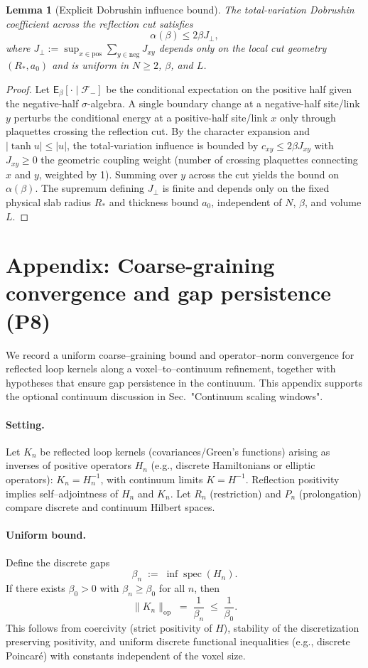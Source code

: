 \documentclass[11pt]{amsart}
\theoremstyle{plain}
\newtheorem{lemma}[theorem]{Lemma}
\theoremstyle{definition}
\theoremstyle{remark}
\begin{document}
\begin{lemma}[Explicit Dobrushin influence bound]\label{lem:dob-influence}
The total-variation Dobrushin coefficient across the reflection cut satisfies
\[
\alpha(\beta) \le 2\beta J_{\perp},
\]
where $J_{\perp} := \sup_{x \in \text{pos}} \sum_{y \in \text{neg}} J_{xy}$ depends only on the local cut geometry $(R_*, a_0)$ and is uniform in $N \ge 2$, $\beta$, and $L$.
\end{lemma}
\begin{proof}
Let $\mathsf{E}_\beta[\cdot \mid \mathcal{F}_{-}]$ be the conditional expectation on the positive half given the negative-half $\sigma$-algebra. A single boundary change at a negative-half site/link $y$ perturbs the conditional energy at a positive-half site/link $x$ only through plaquettes crossing the reflection cut. By the character expansion and $|\tanh u| \le |u|$, the total-variation influence is bounded by $c_{xy} \le 2\beta J_{xy}$ with $J_{xy} \ge 0$ the geometric coupling weight (number of crossing plaquettes connecting $x$ and $y$, weighted by 1). Summing over $y$ across the cut yields the bound on $\alpha(\beta)$. The supremum defining $J_{\perp}$ is finite and depends only on the fixed physical slab radius $R_*$ and thickness bound $a_0$, independent of $N$, $\beta$, and volume $L$.
\end{proof}
\section{Appendix: Coarse-graining convergence and gap persistence (P8)}
We record a uniform coarse--graining bound and operator--norm convergence for reflected loop kernels along a voxel--to--continuum refinement, together with hypotheses that ensure gap persistence in the continuum. This appendix supports the optional continuum discussion in Sec.~"Continuum scaling windows".

\paragraph{Setting.}
Let $K_n$ be reflected loop kernels (covariances/Green's functions) arising as inverses of positive operators $H_n$ (e.g., discrete Hamiltonians or elliptic operators): $K_n=H_n^{-1}$, with continuum limits $K=H^{-1}$. Reflection positivity implies self--adjointness of $H_n$ and $K_n$. Let $R_n$ (restriction) and $P_n$ (prolongation) compare discrete and continuum Hilbert spaces.

\paragraph{Uniform bound.}
Define the discrete gaps
\[
  \beta_n\;:=\;\inf \operatorname{spec}(H_n).
\]
If there exists $\beta_0>0$ with $\beta_n\ge \beta_0$ for all $n$, then
\[
  \lVert K_n\rVert_{\mathrm{op}}\;=\;\frac{1}{\beta_n}\;\le\;\frac{1}{\beta_0}.
\]
This follows from coercivity (strict positivity of $H$), stability of the discretization preserving positivity, and uniform discrete functional inequalities (e.g., discrete Poincar\'e) with constants independent of the voxel size.
\end{document}
